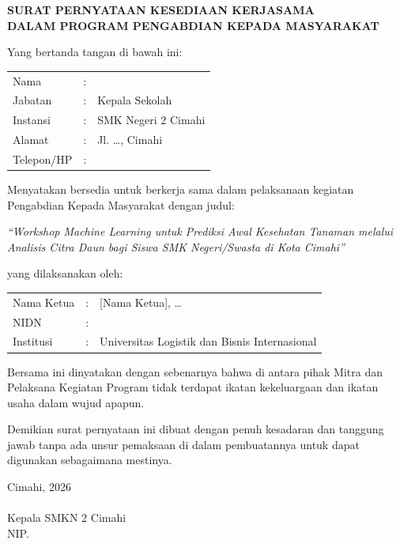 
\begin{center}
    \textbf{SURAT PERNYATAAN KESEDIAAN KERJASAMA}\\
    \textbf{DALAM PROGRAM PENGABDIAN KEPADA MASYARAKAT}
\end{center}

\vspace{0.5cm}

Yang bertanda tangan di bawah ini:

\begin{tabular}{lll}
    Nama        & : & \\
    Jabatan     & : & Kepala Sekolah \\
    Instansi    & : & SMK Negeri 2 Cimahi \\
    Alamat      & : & Jl. \ldots, Cimahi \\
    Telepon/HP  & : & \\
\end{tabular}

\vspace{0.5cm}

Menyatakan bersedia untuk berkerja sama dalam pelaksanaan kegiatan Pengabdian Kepada Masyarakat dengan judul:

\begin{center}
    \textit{``Workshop Machine Learning untuk Prediksi Awal Kesehatan Tanaman melalui Analisis Citra Daun bagi Siswa SMK Negeri/Swasta di Kota Cimahi''}
\end{center}

yang dilaksanakan oleh:

\begin{tabular}{lll}
    Nama Ketua  & : & {[Nama Ketua]}, \ldots \\
    NIDN        & : & \\
    Institusi   & : & Universitas Logistik dan Bisnis Internasional \\
\end{tabular}

\vspace{0.5cm}

Bersama ini dinyatakan dengan sebenarnya bahwa di antara pihak Mitra dan Pelaksana Kegiatan Program tidak terdapat ikatan kekeluargaan dan ikatan usaha dalam wujud apapun.

Demikian surat pernyataan ini dibuat dengan penuh kesadaran dan tanggung jawab tanpa ada unsur pemaksaan di dalam pembuatannya untuk dapat digunakan sebagaimana mestinya.

\vspace{1.5cm}

\begin{flushright}
Cimahi, \hspace{3cm} 2026\\[2.5cm]

\underline{\hspace{6cm}}\\
Kepala SMKN 2 Cimahi\\
NIP.
\end{flushright}
